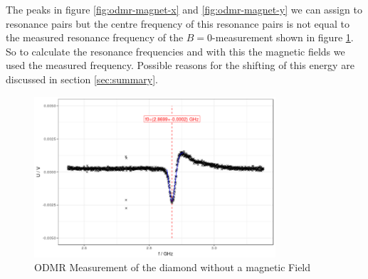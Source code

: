 The peaks in figure \ref{fig:odmr-magnet-x} and \ref{fig:odmr-magnet-y} we can assign to resonance pairs but the centre frequency of this resonance pairs is not equal to the measured resonance frequency of the $B=0$-measurement shown in figure \ref{fig:odmr-no-B}. So to calculate the resonance frequencies and with this the magnetic fields we used the measured frequency. Possible reasons for the shifting of this energy are discussed in section \ref{sec:summary}.

\begin{figure}
	\centering
	\includegraphics[width=0.8\textwidth]{../figures/odmr-1.png}
	\caption{ODMR Measurement of the diamond without a magnetic Field}
	\label{fig:odmr-no-B}
\end{figure}


